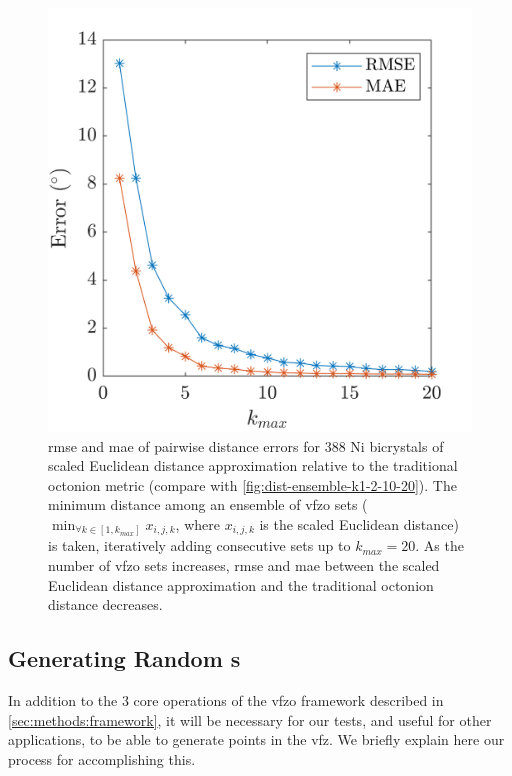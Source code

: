 \documentclass[final,twocolumn,12pt]{elsarticle}
\begin{document}
\begin{figure}
    \centering
    \includegraphics[scale=1]{figures/dist-ensemble-rmse-mae.png}
    \caption{\Gls{rmse} and \gls{mae} of pairwise distance errors for 388 Ni bicrystals \cite{olmstedSurveyComputedGrain2009a} of scaled Euclidean distance approximation relative to the traditional octonion metric \cite{chesserLearningGrainBoundary2020} (compare with \cref{fig:dist-ensemble-k1-2-10-20}). The minimum distance among an ensemble of \gls{vfzo} sets ($\min_{\forall k \in [1,k_{max}]}x_{i,j,k}$, where $x_{i,j,k}$ is the scaled Euclidean distance) is taken, iteratively adding consecutive sets up to $k_{max} = 20$. As the number of \gls{vfzo} sets increases, \gls{rmse} and \gls{mae} between the scaled Euclidean distance approximation and the traditional octonion distance decreases.}
    \label{fig:dist-ensemble-rmse-mae}
\end{figure}

\subsection{Generating Random s}
\label{sec:methods:rand}
In addition to the 3 core operations of the \gls{vfzo} framework described in \cref{sec:methods:framework}, it will be necessary for our tests, and useful for other applications, to be able to generate points in the \gls{vfz}. We briefly explain here our process for accomplishing this. 
\end{document}
